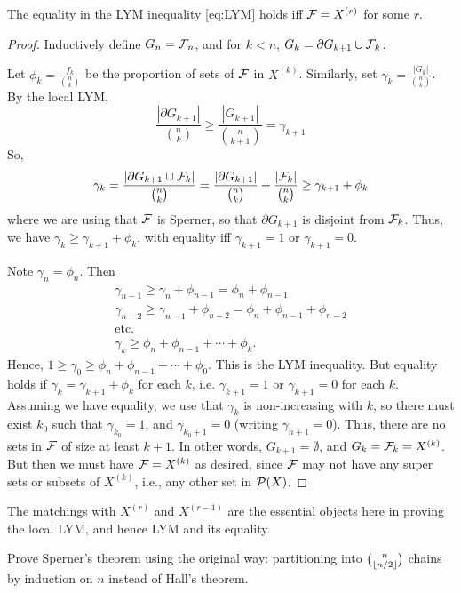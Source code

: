 \begin{theorem}
The equality in the LYM inequality \eqref{eq:LYM} holds iff $\F = X^{(r)}$ for some $r$.
\end{theorem}
\begin{proof}	
Inductively define $G_n = \F_n$, and for $k < n$, $G_k  = \partial G_{k+1} \cup \F_k$. 

Let $\phi_k = \frac{f_k}{{n \choose k}}$ be the proportion of sets of $\F$ in $X^{(k)}$. Similarly, set $\gamma_k = \frac{|G_k|}{{n\choose k}}$. By the local LYM,
\[
\frac{|\partial G_{k+1}|}{{n\choose k}} \geq \frac{|G_{k+1}|}{{n\choose k+1}} = \gamma_{k+1}
\]
So,
\[
\gamma_k = \frac{|\partial G_{k+1} \cup \F_k|}{{n\choose k}} = \frac{|\partial G_{k+1}|}{{n\choose k}} + \frac{|\F_k|}{{n\choose k}} \geq  \gamma_{k+1} + \phi_k
\]
where we are using that $\F$ is Sperner, so that $\partial G_{k+1}$ is disjoint from $\F_k$. Thus, we have $\gamma_k \geq \gamma_{k+1} + \phi_k$, with equality iff $\gamma_{k+1} = 1$ or $\gamma_{k+1} = 0$. 

Note $\gamma_n = \phi_n$. Then
\begin{gather*}	
\gamma_{n-1} \geq \gamma_n + \phi_{n-1} = \phi_n + \phi_{n-1}\\
\gamma_{n-2} \geq \gamma_{n-1} + \phi_{n-2} = \phi_n + \phi_{n-1} + \phi_{n-2}\\
\text{etc.}\\
\gamma_k \geq \phi_n + \phi_{n-1} + \dotsm + \phi_k.
\end{gather*}
Hence, $1 \geq \gamma_0 \geq \phi_n + \phi_{n-1} + \dotsb + \phi_0$. This is the LYM inequality. But equality holds if $\gamma_k = \gamma_{k+1} +\phi_k$ for each $k$, i.e. $\gamma_{k+1} = 1$ or $\gamma_{k+1} = 0$ for each $k$. Assuming we have equality, we use that $\gamma_k$ is non-increasing with $k$, so there must exist $k_0$ such that $\gamma_{k_0} = 1$, and $\gamma_{k_0+1} = 0$ (writing $\gamma_{n+1} = 0$). Thus, there are no sets in $\F$ of size at least $k+1$. In other words, $G_{k+1} = \emptyset$, and $G_k = \F_k = X^{(k)}$. But then we must have $\F  = X^{(k)}$ as desired, since $\F$ may not have any super sets or subsets of $X^{(k)}$, i.e., any other set in $\P(X)$.
\end{proof}
\begin{remark}
The matchings with $X^{(r)}$ and $X^{(r-1)}$ are the essential objects here in proving the local LYM, and hence LYM and its equality.
\end{remark}
\begin{exercise}
Prove Sperner's theorem using the original way: partitioning into ${n\choose \floor{n/2}}$ chains by induction on $n$ instead of Hall's theorem.
\end{exercise}

